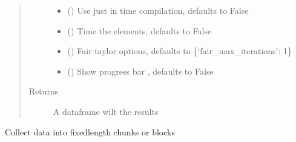 \documentclass[letterpaper,10pt,english]{sphinxmanual}
\begin{document}
\begin{fulllineitems}
\begin{fulllineitems}
\begin{quote}
\begin{description}
\begin{itemize}
\item {} 
\sphinxAtStartPar
{} (\sphinxstyleliteralemphasis{\sphinxupquote{, }}) \textendash{} Use just in time compilation, defaults to False

\item {} 
\sphinxAtStartPar
{} (\sphinxstyleliteralemphasis{\sphinxupquote{, }}) \textendash{} Time the elements, defaults to False

\item {} 
\sphinxAtStartPar
{} (\sphinxstyleliteralemphasis{\sphinxupquote{, }}) \textendash{} Fair taylor options, defaults to \{‘fair\_max\_iterations’: 1\}

\item {} 
\sphinxAtStartPar
{} (\sphinxstyleliteralemphasis{\sphinxupquote{, }}) \textendash{} Show progress bar , defaults to False

\end{itemize}

\item[{Returns}] \leavevmode
\sphinxAtStartPar
A dataframe wilt the results

\end{description}\end{quote}

\end{fulllineitems}


\begin{fulllineitems}
\label{\detokenize{core/modelclass:modelclass.Solver_Mixin.grouper}}
\pysigstartsignatures
{}
\pysigstopsignatures
\sphinxAtStartPar
Collect data into fixed\sphinxhyphen{}length chunks or blocks


\end{fulllineitems}
\end{fulllineitems}
\end{document}
